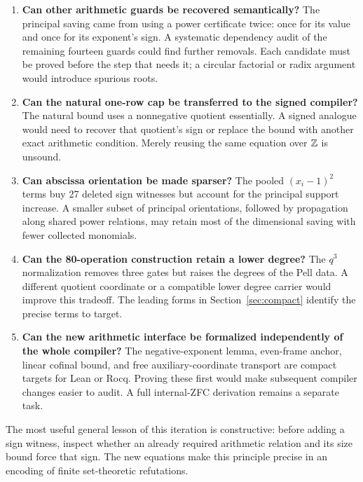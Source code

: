 \begin{enumerate}
\item \textbf{Can other arithmetic guards be recovered semantically?}
The principal saving came from using a power certificate twice: once for
its value and once for its exponent's sign. A systematic dependency audit
of the remaining fourteen guards could find further removals. Each
candidate must be proved before the step that needs it; a circular
factorial or radix argument would introduce spurious roots.
\item \textbf{Can the natural one-row cap be transferred to the signed
compiler?} The natural bound uses a nonnegative quotient essentially.
A signed analogue would need to recover that quotient's sign or replace
the bound with another exact arithmetic condition. Merely reusing the
same equation over $\mathbb Z$ is unsound.
\item \textbf{Can abscissa orientation be made sparser?} The pooled
$(x_i-1)^2$ terms buy 27 deleted sign witnesses but account for the
principal support increase. A smaller subset of principal orientations,
followed by propagation along shared power relations, may retain most of
the dimensional saving with fewer collected monomials.
\item \textbf{Can the 80-operation construction retain a lower degree?}
The $q^3$ normalization removes three gates but raises the degrees of
the Pell data. A different quotient coordinate or a compatible lower
degree carrier would improve this tradeoff. The leading forms in
Section~\ref{sec:compact} identify the precise terms to target.
\item \textbf{Can the new arithmetic interface be formalized independently
of the whole compiler?} The negative-exponent lemma, even-frame anchor,
linear cofinal bound, and free auxiliary-coordinate transport are compact
targets for Lean or Rocq. Proving these first would make subsequent
compiler changes easier to audit. A full internal-ZFC derivation remains
a separate task.
\end{enumerate}

The most useful general lesson of this iteration is constructive: before
adding a sign witness, inspect whether an already required arithmetic
relation and its size bound force that sign. The new equations make this
principle precise in an encoding of finite set-theoretic refutations.
